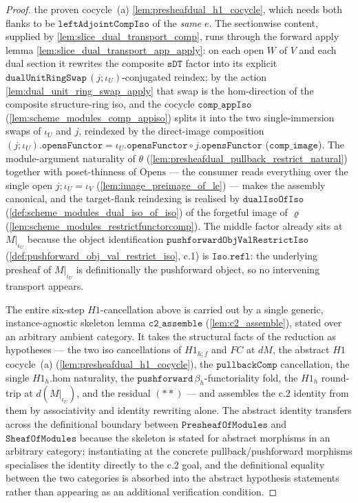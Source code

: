 \begin{proof}
  the proven cocycle~(a) \cref{lem:presheafdual_h1_cocycle}, which needs both flanks to be
  \(\mathtt{leftAdjointCompIso}\) of the \emph{same} \(e\).
  The sectionwise content, supplied by \cref{lem:slice_dual_transport_comp}, runs
  through the forward apply lemma \cref{lem:slice_dual_transport_app_apply}: on each open \(W\) of \(V\)
  and each dual section it rewrites the composite \(\mathtt{sDT}\) factor into its explicit
  \(\mathtt{dualUnitRingSwap}\,(j\mathbin{;}\iota_U)\)-conjugated reindex; by the action
  \cref{lem:dual_unit_ring_swap_apply} that swap is the \(\mathrm{hom}\)-direction of the composite
  structure-ring iso, and the cocycle \(\mathtt{comp\_appIso}\) (\cref{lem:scheme_modules_comp_appiso})
  splits it into the two single-immersion swaps of \(\iota_U\) and \(j\), reindexed by the direct-image
  composition \((j\mathbin{;}\iota_U).\mathtt{opensFunctor} =
  \iota_U.\mathtt{opensFunctor}\circ j.\mathtt{opensFunctor}\) (\(\mathtt{comp\_image}\)). The
  module-argument naturality of \(\theta\)
  (\cref{lem:presheafdual_pullback_restrict_natural}) together with poset-thinness of
  \(\mathrm{Opens}\) --- the consumer reads everything over the single open \(j\mathbin{;}\iota_U=\iota_V\)
  (\cref{lem:image_preimage_of_le}) --- makes the assembly canonical, and the target-flank reindexing is
  realised by \(\mathtt{dualIsoOfIso}\) (\cref{def:scheme_modules_dual_iso_of_iso}) of the forgetful image
  of \(\varrho\) (\cref{lem:scheme_modules_restrictfunctorcomp}). The middle factor already sits at
  \(M|_{\iota_U}\) because the object identification \(\mathtt{pushforwardObjValRestrictIso}\)
  (\cref{def:pushforward_obj_val_restrict_iso}, c.1) is \(\mathtt{Iso.refl}\): the underlying presheaf
  of \(M|_{\iota_U}\) is definitionally the pushforward object, so no intervening transport appears.

  The entire six-step \(H1\)-cancellation above is carried out by a single generic,
  instance-agnostic skeleton lemma \(\mathtt{c2\_assemble}\) (\cref{lem:c2_assemble}), stated over an
  arbitrary ambient category. It takes the structural facts of the reduction as hypotheses --- the two
  iso cancellations of \(H1_{h \mathbin{;} f}\) and \(FC\) at \(dM\), the abstract \(H1\) cocycle~(a)
  (\cref{lem:presheafdual_h1_cocycle}), the \(\mathtt{pullbackComp}\) cancellation, the single
  \(H1_h.\mathrm{hom}\) naturality, the \(\mathtt{pushforward}\,\beta_h\)-functoriality fold, the
  \(H1_h\) round-trip at \(d(M|_{\iota_U})\), and the residual \((**)\) --- and assembles the c.2
  identity from them by associativity and identity rewriting alone. The abstract identity transfers
  across the definitional boundary between \(\mathtt{PresheafOfModules}\) and
  \(\mathtt{SheafOfModules}\) because the skeleton is stated for abstract morphisms in an arbitrary
  category: instantiating at the concrete pullback/pushforward morphisms specialises the identity
  directly to the c.2 goal, and the definitional equality between the two categories is absorbed into
  the abstract hypothesis statements rather than appearing as an additional verification condition.
\end{proof}

